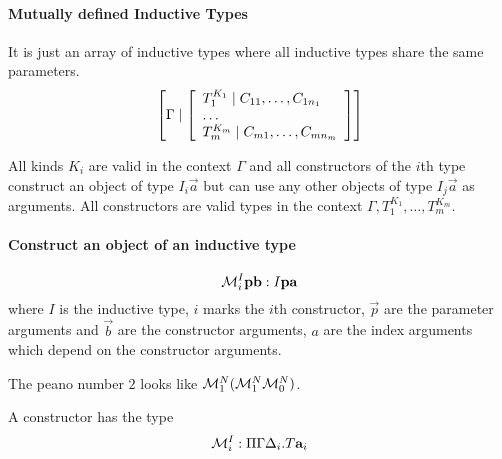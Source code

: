 \paragraph{Mutually defined Inductive Types}

It is just an array of inductive types where all inductive types share the same
parameters.
$$
    \left[\Gamma \mid
    \left[ \begin{array}{lllll} 
        T_1^{K_1} \mid C_{11}, \ldots, C_{1n_1}
        \\
        \ldots
        \\
        T_m^{K_m} \mid C_{m1}, \ldots, C_{mn_m}
     \end{array} \right]
    \right]
$$

All kinds $K_i$ are valid in the context $\Gamma$ and all constructors of the
$i$th type construct an object of type $I_i \vec a$ but can use any other
objects of type $I_j \vec a$ as arguments. All constructors are valid types in
the context $\Gamma, T_1^{K_1}, \ldots , T_m^{K_m}$.



\paragraph{Construct an object of an inductive type}
$$
    {\cal M}^I_i {\mathbf p} {\mathbf b}: I {\mathbf p} {\mathbf a}
$$
where $I$ is the inductive type, $i$ marks the $i$th constructor, $\vec p$ are
the parameter arguments and $\vec b$ are the constructor arguments, $a$ are the
index arguments which depend on the constructor arguments.

The peano number $2$ looks like $ {\cal M}^N_1 ({\cal M}^N_1 {\cal M}^N_0) $.

A constructor has the type
$$
    {\cal M}^I_i : \Pi \Gamma \Delta_i. T {{\mathbf a}}_i
$$
